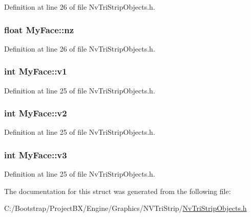 Definition at line 26 of file NvTriStripObjects.h.\hypertarget{struct_my_face_9b8303783e6ece8c61fbb429701692a3}{
\subsubsection[{nz}]{\setlength{\rightskip}{0pt plus 5cm}float {\bf MyFace::nz}}}
\label{struct_my_face_9b8303783e6ece8c61fbb429701692a3}




Definition at line 26 of file NvTriStripObjects.h.\hypertarget{struct_my_face_1283eaadb0b4dc40dad697435a4690ac}{
\subsubsection[{v1}]{\setlength{\rightskip}{0pt plus 5cm}int {\bf MyFace::v1}}}
\label{struct_my_face_1283eaadb0b4dc40dad697435a4690ac}




Definition at line 25 of file NvTriStripObjects.h.\hypertarget{struct_my_face_cfc0eda523642a52df86c7c85d90193c}{
\subsubsection[{v2}]{\setlength{\rightskip}{0pt plus 5cm}int {\bf MyFace::v2}}}
\label{struct_my_face_cfc0eda523642a52df86c7c85d90193c}




Definition at line 25 of file NvTriStripObjects.h.\hypertarget{struct_my_face_d3c6461df194c56250abbca8603a65b5}{
\subsubsection[{v3}]{\setlength{\rightskip}{0pt plus 5cm}int {\bf MyFace::v3}}}
\label{struct_my_face_d3c6461df194c56250abbca8603a65b5}




Definition at line 25 of file NvTriStripObjects.h.

The documentation for this struct was generated from the following file:\begin{CompactItemize}
\item 
C:/Bootstrap/ProjectBX/Engine/Graphics/NVTriStrip/\hyperlink{_nv_tri_strip_objects_8h}{NvTriStripObjects.h}\end{CompactItemize}
